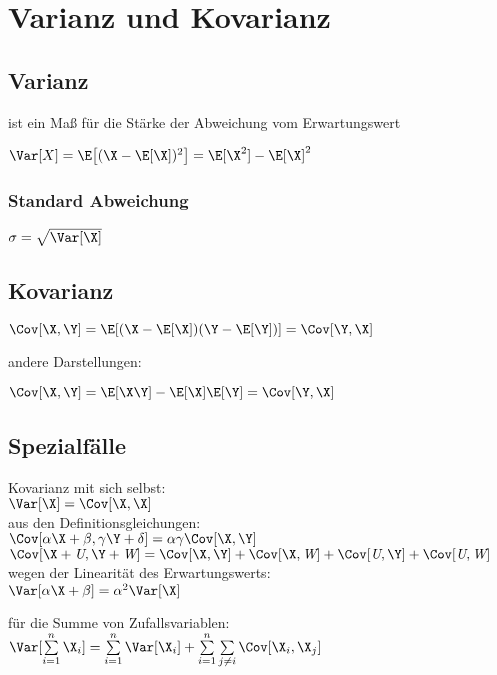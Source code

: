 \documentclass[german,color,6pt]{latex4ei/latex4ei_sheet}
\DeclareMathOperator{\U}{\textit{U}}				%
\DeclareMathOperator{\V}{\textit{W}}				%
\begin{document}
\section{Varianz und Kovarianz}
\begin{sectionbox}
	\subsection{Varianz}
	ist ein Maß für die Stärke der Abweichung vom Erwartungswert\\
	\begin{emphbox}
		$\Var [X] = \E \big[(\X - \E[\X])^2\big] = \E[\X^2] - \E[\X]^2$
	\end{emphbox}
	\subsubsection{Standard Abweichung}
	$\sigma = \sqrt{\Var[\X]}$	
\end{sectionbox}

\begin{sectionbox}
	\subsection{Kovarianz}
	
	\begin{emphbox}
		{$\Cov [\X,\Y] = \E[(\X- \E[\X])(\Y - \E[\Y])] = \Cov [\Y, \X]$}
	\end{emphbox}
	
	andere Darstellungen:
	
	$\Cov [\X,\Y] = \E [\X\Y] - \E[\X] \E[\Y] = \Cov[\Y, \X]$
\end{sectionbox}

\begin{sectionbox}
	\subsection{Spezialfälle}
	Kovarianz mit sich selbst:  \\
	$\Var [\X] = \Cov [\X,\X]$ \\
	
	aus den Definitionsgleichungen: \\
	$\Cov [\alpha \X + \beta, \gamma \Y + \delta] = \alpha \gamma \Cov [\X, \Y]$ \\
	$\Cov [ \X + \U, \Y + \V] = \Cov [\X, \Y] + \Cov [\X, \V] + \Cov [\U, \Y] + \Cov [\U, \V]$ \\
	
	wegen der Linearität des Erwartungswerts: \\
	$\Var [ \alpha \X + \beta] = \alpha^2 \Var [\X]$
	
	für die Summe von Zufallsvariablen:  \\
	$\Var [\sum \limits_{i=1}^n \X_i] = \sum \limits_{i=1}^{n} \Var [\X_i] + \sum \limits_{i=1}^{n} \sum \limits_{j \not= i} \Cov [\X_i, 	\X_j]$ \\
\end{sectionbox}
\end{document}
